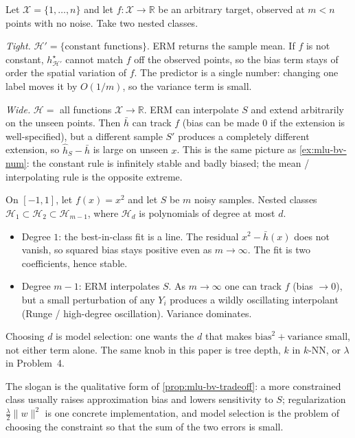 \begin{example}
\label{exmp:mlu-bv-const}
Let $\mathcal{X}=\{1,\dots,n\}$ and let $f:\mathcal{X}\to\mathbb{R}$ be an arbitrary target, observed at $m<n$ points with no noise. Take two nested classes.

\textit{Tight.}
$\mathcal{H}'=\{\text{constant functions}\}$. ERM returns the sample mean. If $f$ is not constant, $h^\star_{\mathcal{H}'}$ cannot match $f$ off the observed points, so the bias term stays of order the spatial variation of $f$. The predictor is a single number: changing one label moves it by $O(1/m)$, so the variance term is small.

\textit{Wide.}
$\mathcal{H}=$ all functions $\mathcal{X}\to\mathbb{R}$. ERM can interpolate $S$ and extend arbitrarily on the unseen points. Then $\bar h$ can track $f$ (bias can be made $0$ if the extension is well-specified), but a different sample $S'$ produces a completely different extension, so $\widehat h_S-\bar h$ is large on unseen $x$. This is the same picture as \cref{ex:mlu-bv-num}: the constant rule is infinitely stable and badly biased; the mean / interpolating rule is the opposite extreme.
\end{example}

\begin{example}
\label{exmp:mlu-bv-poly}
On $[-1,1]$, let $f(x)=x^2$ and let $S$ be $m$ noisy samples. Nested classes $\mathcal{H}_1\subset\mathcal{H}_2\subset\mathcal{H}_{m-1}$, where $\mathcal{H}_d$ is polynomials of degree at most $d$.
\begin{itemize}
    \item Degree $1$: the best-in-class fit is a line. The residual $x^2-\bar h(x)$ does not vanish, so squared bias stays positive even as $m\to\infty$. The fit is two coefficients, hence stable.
    \item Degree $m-1$: ERM interpolates $S$. As $m\to\infty$ one can track $f$ (bias $\to 0$), but a small perturbation of any $Y_i$ produces a wildly oscillating interpolant (Runge / high-degree oscillation). Variance dominates.
\end{itemize}
Choosing $d$ is model selection: one wants the $d$ that makes $\mathrm{bias}^2+\mathrm{variance}$ small, not either term alone. The same knob in this paper is tree depth, $k$ in $k$-NN, or $\lambda$ in Problem~4.
\end{example}

The slogan is the qualitative form of \cref{prop:mlu-bv-tradeoff}: a more constrained class usually raises approximation bias and lowers sensitivity to $S$; regularization $\tfrac{\lambda}{2}\lVert w\rVert^2$ is one concrete implementation, and model selection is the problem of choosing the constraint so that the sum of the two errors is small.

